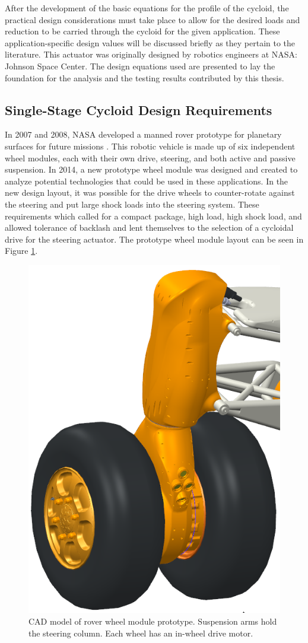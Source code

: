 After the development of the basic equations for the profile of the cycloid, the practical design considerations must take place to allow for the desired loads and reduction to be carried through the cycloid for the given application. These application-specific design values will be discussed briefly as they pertain to the literature. This actuator was originally designed by robotics engineers at NASA: Johnson Space Center. The design equations used are presented to lay the foundation for the analysis and the testing results contributed by this thesis.

\subsection{Single-Stage Cycloid Design Requirements}

In 2007 and 2008, NASA developed a manned rover prototype for planetary surfaces for future missions \cite{ref:rover}.
This robotic vehicle is made up of six independent wheel modules, each with their own drive, steering, and both active and passive suspension.
In 2014, a new prototype wheel module was designed and created to analyze potential technologies that could be used in these applications.
In the new design layout, it was possible for the drive wheels to counter-rotate against the steering and put large shock loads into the steering system.
These requirements which called for a compact package, high load, high shock load, and allowed tolerance of backlash and lent themselves to the selection of a cycloidal drive for the steering actuator.
The prototype wheel module layout can be seen in Figure \ref{fig:wheel_module}.

\begin{figure}[!b]
   \centering
   \includegraphics[width=0.40\linewidth]{fig/wheel_module_CAD}
   \caption{CAD model of rover wheel module prototype.
   Suspension arms hold the steering column.
   Each wheel has an in-wheel drive motor.}
   \label{fig:wheel_module}
\end{figure}

